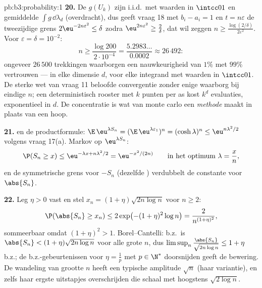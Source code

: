 \begin{solution}{pb:b3:probability:1}
\textbf{20.} De $g(U_k)$ zijn i.i.d.\ met waarden in $\intcc01$
en gemiddelde $\int g\,\dd\lambda_d$ (overdracht), dus geeft
vraag 18 met $b_i - a_i = 1$ en $t = n\varepsilon$ de tweezijdige
grens $2\eu^{-2n\varepsilon^2} \leq \delta$ zodra
$\eu^{2n\varepsilon^2} \geq \frac2\delta$, dat wil zeggen $n \geq
\frac{\log(2/\delta)}{2\varepsilon^2}$. Voor $\varepsilon =
\delta = 10^{-2}$:
\[
n \geq \frac{\log 200}{2\cdot10^{-4}} =
\frac{5.2983\ldots}{0.0002} \approx 26\,492 :
\]
ongeveer $26\,500$ trekkingen waarborgen een nauwkeurigheid van
$1\%$ met $99\%$ vertrouwen --- in elke dimensie $d$, voor elke
 integrand met waarden in $\intcc01$. De sterke wet van
vraag 11 beloofde convergentie zonder enige waarborg bij eindige
$n$; een deterministisch rooster met $k$ punten per as kost $k^d$
evaluaties, exponentieel in $d$. De concentratie is wat van monte
carlo een \emph{methode} maakt in plaats van een hoop.

\textbf{21.}  en de productformule:
$\E\,\eu^{\lambda S_n} = (\E\,\eu^{\lambda\varepsilon_1})^n =
(\cosh\lambda)^n \leq \eu^{n\lambda^2/2}$ volgens vraag 17(a).
Markov op $\eu^{\lambda S_n}$:
\[
\P(S_n \geq x) \leq \eu^{-\lambda x + n\lambda^2/2}
= \eu^{-x^2/(2n)}
\qquad\text{in het optimum } \lambda = \frac xn,
\]
en de symmetrische grens voor $-S_n$ (dezelfde )
verdubbelt de constante voor $\abs{S_n}$.

\textbf{22.} Leg $\eta > 0$ vast en stel $x_n = (1 +
\eta)\sqrt{2n\log n}$ voor $n \geq 2$:
\[
\P(\abs{S_n} \geq x_n) \leq 2\exp\bigl(-(1 +
\eta)^2\log n\bigr) = \frac{2}{n^{(1+\eta)^2}},
\]
sommeerbaar omdat $(1 + \eta)^2 > 1$. Borel--Cantelli: b.z.\ is
$\abs{S_n} < (1 + \eta)\sqrt{2n\log n}$ voor alle grote $n$, dus
$\limsup_n\frac{\abs{S_n}}{\sqrt{2n\log n}} \leq 1 + \eta$ b.z.;
de b.z.-gebeurtenissen voor $\eta = \frac1p$ met $p \in \N^*$
doorsnijden geeft de bewering. De wandeling van grootte $n$ heeft
een typische amplitude $\sqrt n$ (haar variantie), en zelfs haar
ergste uitstapjes overschrijden die schaal met hoogstens
$\sqrt{2\log n}$.


\end{solution}
